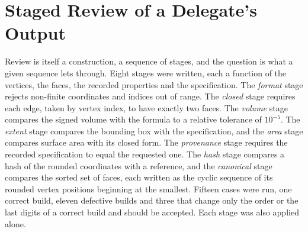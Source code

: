 \section{Staged Review of a Delegate's Output}

Review is itself a construction, a sequence of stages, and the question is what a given sequence lets through. Eight stages were written, each a function of the vertices, the faces, the recorded properties and the specification. The \emph{format} stage rejects non-finite coordinates and indices out of range. The \emph{closed} stage requires each edge, taken by vertex index, to have exactly two faces. The \emph{volume} stage compares the signed volume with the formula to a relative tolerance of $10^{-5}$. The \emph{extent} stage compares the bounding box with the specification, and the \emph{area} stage compares surface area with its closed form. The \emph{provenance} stage requires the recorded specification to equal the requested one. The \emph{hash} stage compares a hash of the rounded coordinates with a reference, and the \emph{canonical} stage compares the sorted set of faces, each written as the cyclic sequence of its rounded vertex positions beginning at the smallest. Fifteen cases were run, one correct build, eleven defective builds and three that change only the order or the last digits of a correct build and should be accepted. Each stage was also applied alone.

